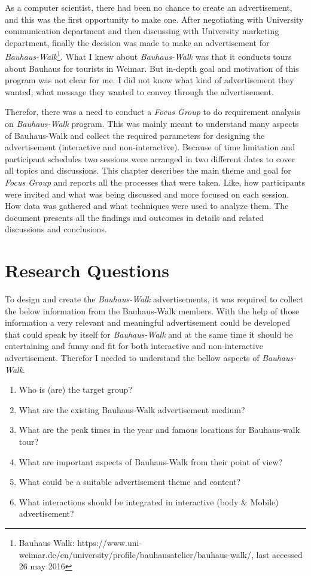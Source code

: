 As a computer scientist, there had been no chance to create an advertisement, and this was the first opportunity to make one. After negotiating with University communication department and then discussing with University marketing department, finally the decision was made to make an advertisement for \emph{Bauhaus-Walk}\footnote{Bauhaus Walk: https://www.uni-weimar.de/en/university/profile/bauhausatelier/bauhaus-walk/, last accessed 26 may 2016}. What I knew about \emph{Bauhaus-Walk} was that it conducts tours about Bauhaus for tourists in Weimar. But in-depth goal and motivation of this program was not clear for me. I did not know what kind of advertisement they wanted, what message they wanted to convey through the advertisement.
   
Therefor, there was a need to conduct a \emph{Focus Group} to do requirement analysis on \emph{Bauhaus-Walk} program. This was mainly meant to understand many aspects of Bauhaus-Walk and collect the required parameters for designing the advertisement (interactive and non-interactive). Because of time limitation and participant schedules two sessions were arranged in two different dates to cover all topics and discussions. This chapter describes the main theme and goal for \emph{Focus Group} and reports all the processes that were taken. Like, how participants were invited and what was being discussed and more focused on each session. How data was gathered and what techniques were used to analyze them. The document presents all the findings and outcomes in details and related discussions and conclusions.

\section{Research Questions}
To design and create the \emph{Bauhaus-Walk} advertisements, it was required to collect the below information from the Bauhaus-Walk members. With the help of those information a very relevant and meaningful advertisement could be developed that could speak by itself for \emph{Bauhaus-Walk} and at the same time it should be entertaining and funny and fit for both interactive and non-interactive advertisement. Therefor I needed to understand the bellow aspects of \emph{Bauhaus-Walk}.

\begin{enumerate}
\item Who is (are) the target group?
\item What are the existing Bauhaus-Walk advertisement medium?
\item What are the peak times in the year and famous locations for Bauhaus-walk tour?
\item What are important aspects of Bauhaus-Walk from their point of view?
\item What could be a suitable advertisement theme and content?
\item What interactions should be integrated in interactive (body \& Mobile) advertisement?
\end{enumerate}




